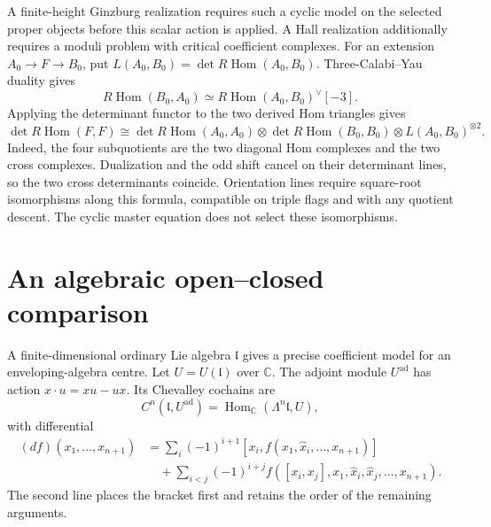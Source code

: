 A finite-height Ginzburg realization requires such a cyclic model on
the selected proper objects before this scalar action is applied.
A Hall realization additionally requires a moduli problem with
critical coefficient complexes.
For an extension $A_0\to F\to B_0$, put
$L(A_0,B_0)=\det R\operatorname{Hom}(A_0,B_0)$.
Three-Calabi--Yau duality gives
\[
 R\operatorname{Hom}(B_0,A_0)
 \simeq R\operatorname{Hom}(A_0,B_0)^\vee[-3].
\]
Applying the determinant functor to the two derived Hom triangles gives
\[
 \det R\operatorname{Hom}(F,F)
 \cong \det R\operatorname{Hom}(A_0,A_0)
 \otimes\det R\operatorname{Hom}(B_0,B_0)
 \otimes L(A_0,B_0)^{\otimes2}.
\]
Indeed, the four subquotients are the two diagonal Hom complexes and
the two cross complexes.
Dualization and the odd shift cancel on their determinant lines,
so the two cross determinants coincide.
Orientation lines require square-root isomorphisms along this formula,
compatible on triple flags and with any quotient descent.
The cyclic master equation does not select these isomorphisms.

\chapter{An algebraic open--closed comparison}
A finite-dimensional ordinary Lie algebra $\mathfrak l$ gives a
precise coefficient model for an enveloping-algebra centre.
Let $U=U(\mathfrak l)$ over $\mathbb C$.
The adjoint module $U^{\mathrm{ad}}$ has action
$x\cdot u=xu-ux$.
Its Chevalley cochains are
\[
 C^n(\mathfrak l,U^{\mathrm{ad}})
 =\operatorname{Hom}_{\mathbb C}(\Lambda^n\mathfrak l,U),
\]
with differential
\[
\begin{split}
 (df)(x_1,\ldots,x_{n+1})
 &=\sum_i(-1)^{i+1}[x_i,f(x_1,\widehat x_i,\ldots,x_{n+1})]\\
 &\quad+\sum_{i<j}(-1)^{i+j}
 f([x_i,x_j],x_1,\widehat x_i,\widehat x_j,\ldots,x_{n+1}).
\end{split}
\]
The second line places the bracket first and retains the order of the
remaining arguments.


